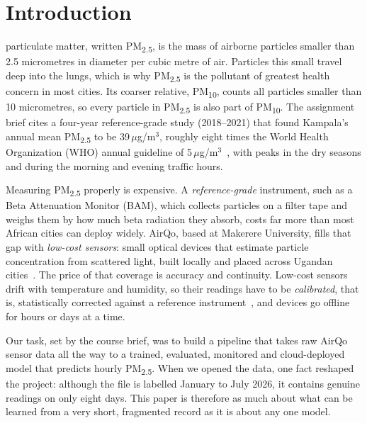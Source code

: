\documentclass{ieeeaccess}
\newcommand{\ugm}{\,$\mu$g/m$^{3}$}
\newcommand{\pmtwo}{PM\textsubscript{2.5}}
\newcommand{\pmten}{PM\textsubscript{10}}
\begin{document}
\titlepgskip=-15pt
\maketitle

\section{Introduction}
\label{sec:intro}

 particulate matter, written \pmtwo{}, is the mass of airborne particles smaller than 2.5 micrometres in diameter per cubic metre of air. Particles this small travel deep into the lungs, which is why \pmtwo{} is the pollutant of greatest health concern in most cities. Its coarser relative, \pmten{}, counts all particles smaller than 10 micrometres, so every particle in \pmtwo{} is also part of \pmten{}. The assignment brief cites a four-year reference-grade study (2018--2021) that found Kampala's annual mean \pmtwo{} to be 39\ugm{}, roughly eight times the World Health Organization (WHO) annual guideline of 5\ugm{}~\cite{who2021}, with peaks in the dry seasons and during the morning and evening traffic hours.

Measuring \pmtwo{} properly is expensive. A \emph{reference-grade} instrument, such as a Beta Attenuation Monitor (BAM), which collects particles on a filter tape and weighs them by how much beta radiation they absorb, costs far more than most African cities can deploy widely. AirQo, based at Makerere University, fills that gap with \emph{low-cost sensors}: small optical devices that estimate particle concentration from scattered light, built locally and placed across Ugandan cities~\cite{okure2022,sserunjogi2022}. The price of that coverage is accuracy and continuity. Low-cost sensors drift with temperature and humidity, so their readings have to be \emph{calibrated}, that is, statistically corrected against a reference instrument~\cite{adong2022}, and devices go offline for hours or days at a time.

Our task, set by the course brief, was to build a pipeline that takes raw AirQo sensor data all the way to a trained, evaluated, monitored and cloud-deployed model that predicts hourly \pmtwo{}. When we opened the data, one fact reshaped the project: although the file is labelled January to July 2026, it contains genuine readings on only eight days. This paper is therefore as much about what can be learned from a very short, fragmented record as it is about any one model.
\end{document}
